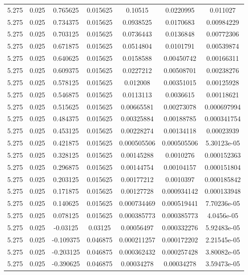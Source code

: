 \begin{flushleft}
\begin{longtable}{ccccccc}
5.275 & 0.025 & 0.765625 & 0.015625 & 0.10515 & 0.0220995 & 0.011027  \\ 
5.275 & 0.025 & 0.734375 & 0.015625 & 0.0938525 & 0.0170683 & 0.00984229  \\ 
5.275 & 0.025 & 0.703125 & 0.015625 & 0.0736443 & 0.0136848 & 0.00772306  \\ 
5.275 & 0.025 & 0.671875 & 0.015625 & 0.0514804 & 0.0101791 & 0.00539874  \\ 
5.275 & 0.025 & 0.640625 & 0.015625 & 0.0158588 & 0.00450742 & 0.00166311  \\ 
5.275 & 0.025 & 0.609375 & 0.015625 & 0.0227212 & 0.00508701 & 0.00238276  \\ 
5.275 & 0.025 & 0.578125 & 0.015625 & 0.012008 & 0.00351015 & 0.00125928  \\ 
5.275 & 0.025 & 0.546875 & 0.015625 & 0.0113113 & 0.0036615 & 0.00118621  \\ 
5.275 & 0.025 & 0.515625 & 0.015625 & 0.00665581 & 0.00273078 & 0.000697994  \\ 
5.275 & 0.025 & 0.484375 & 0.015625 & 0.00325884 & 0.00188785 & 0.000341754  \\ 
5.275 & 0.025 & 0.453125 & 0.015625 & 0.00228274 & 0.00134118 & 0.00023939  \\ 
5.275 & 0.025 & 0.421875 & 0.015625 & 0.000505506 & 0.000505506 & 5.30123e-05  \\ 
5.275 & 0.025 & 0.328125 & 0.015625 & 0.00145288 & 0.0010276 & 0.000152363  \\ 
5.275 & 0.025 & 0.296875 & 0.015625 & 0.00144754 & 0.00104157 & 0.000151804  \\ 
5.275 & 0.025 & 0.203125 & 0.015625 & 0.00177212 & 0.0010397 & 0.000185842  \\ 
5.275 & 0.025 & 0.171875 & 0.015625 & 0.00127728 & 0.000934142 & 0.000133948  \\ 
5.275 & 0.025 & 0.140625 & 0.015625 & 0.000734469 & 0.000519441 & 7.70236e-05  \\ 
5.275 & 0.025 & 0.078125 & 0.015625 & 0.000385773 & 0.000385773 & 4.0456e-05  \\ 
5.275 & 0.025 & -0.03125 & 0.03125 & 0.00056497 & 0.000332276 & 5.92483e-05  \\ 
5.275 & 0.025 & -0.109375 & 0.046875 & 0.000211257 & 0.000172202 & 2.21545e-05  \\ 
5.275 & 0.025 & -0.203125 & 0.046875 & 0.000362432 & 0.000257428 & 3.80082e-05  \\ 
5.275 & 0.025 & -0.390625 & 0.046875 & 0.00034278 & 0.00034278 & 3.59473e-05  \\ 

\end{longtable}
\end{flushleft}
